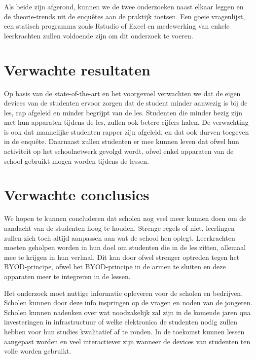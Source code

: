 Als beide zijn afgerond, kunnen we de twee onderzoeken naast elkaar leggen en de theorie-trends uit de enquêtes aan de praktijk toetsen. Een goeie vragenlijst, een statisch programma zoals Rstudio of Excel en medewerking van enkele leerkrachten zullen voldoende zijn om dit onderzoek te voeren.

\section{Verwachte resultaten}
\label{sec:verwachte_resultaten}

Op basis van de state-of-the-art en het voorgevoel verwachten we dat de eigen devices van de studenten ervoor zorgen dat de student minder aanwezig is bij de les, rap afgeleid en minder begrijpt van de les. Studenten die minder bezig zijn met hun apparaten tijdens de les, zullen ook betere cijfers halen. De verwachting is ook dat mannelijke studenten rapper zijn afgeleid, en dat ook durven toegeven in de enquête. Daarnaast zullen studenten er mee kunnen leven dat ofwel hun activiteit op het schoolnetwerk gevolgd wordt, ofwel enkel apparaten van de school gebruikt mogen worden tijdens de lessen.

\section{Verwachte conclusies}
\label{sec:verwachte_conclusies}

We hopen te kunnen concluderen dat scholen nog veel meer kunnen doen om de aandacht van de studenten hoog te houden. Strenge regels of niet, leerlingen zullen zich toch altijd aanpassen aan wat de school hen oplegt. Leerkrachten moeten geholpen worden in hun doel om studenten die in de les zitten, allemaal mee te krijgen in hun verhaal. Dit kan door ofwel strenger optreden tegen het BYOD-principe, ofwel het BYOD-principe in de armen te sluiten en deze apparaten meer te integreren in de lessen.   

Het onderzoek moet nuttige informatie opleveren voor de scholen en bedrijven. Scholen kunnen door deze info inspringen op de vragen en noden van de jongeren. Scholen kunnen nadenken over wat noodzakelijk zal zijn in de komende jaren qua investeringen in infrastructuur of welke elektronica de studenten nodig zullen hebben voor hun studies kwalitatief af te ronden. In de toekomst kunnen lessen aangepast worden en veel interactiever zijn wanneer de devices van studenten ten volle worden gebruikt. 

